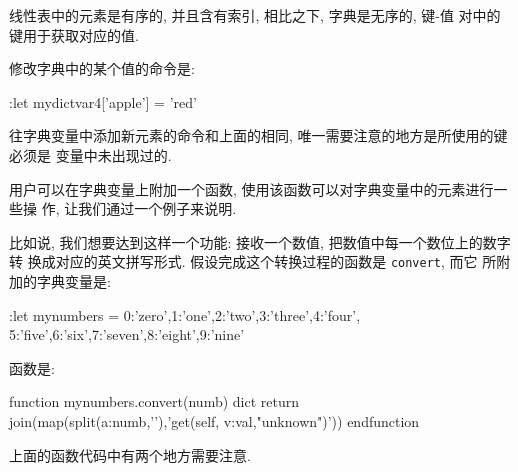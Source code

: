 线性表中的元素是有序的, 并且含有索引, 相比之下, 字典是无序的, \mbox{键}-值
对中的键用于获取对应的值.

修改字典中的某个值的命令是:
\begin{vimcode}
:let mydictvar4['apple'] = 'red'
\end{vimcode}
往字典变量中添加新元素的命令和上面的相同, 唯一需要注意的地方是所使用的键必须是
变量中未出现过的.

用户可以在字典变量上附加一个函数, 使用该函数可以对字典变量中的元素进行一些操
作, 让我们通过一个例子来说明.

比如说, 我们想要达到这样一个功能: 接收一个数值, 把数值中每一个数位上的数字转
换成对应的英文拼写形式. 假设完成这个转换过程的函数是 \texttt{convert}, 而它
所附加的字典变量是:
\begin{vimcode}
:let mynumbers = {0:'zero',1:'one',2:'two',3:'three',4:'four',
                5:'five',6:'six',7:'seven',8:'eight',9:'nine'}
\end{vimcode}
函数是:
\begin{vimcode}
function mynumbers.convert(numb) dict
    return join(map(split(a:numb,'\zs'),'get(self, v:val,"unknown")'))
endfunction
\end{vimcode}
上面的函数代码中有两个地方需要注意.

